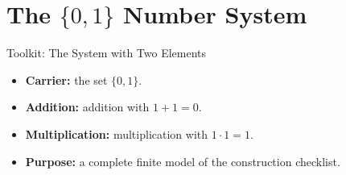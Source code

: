 \section{The \(\{0,1\}\) Number System}
\begin{toolkitbox}{Toolkit: The System with Two Elements}
\begin{itemize}
  \item \textbf{Carrier:} the set \(\{0,1\}\).
  \item \textbf{Addition:} addition with \(1+1=0\).
  \item \textbf{Multiplication:} multiplication with \(1\cdot 1=1\).
  \item \textbf{Purpose:} a complete finite model of the construction checklist.
\end{itemize}
\end{toolkitbox}


